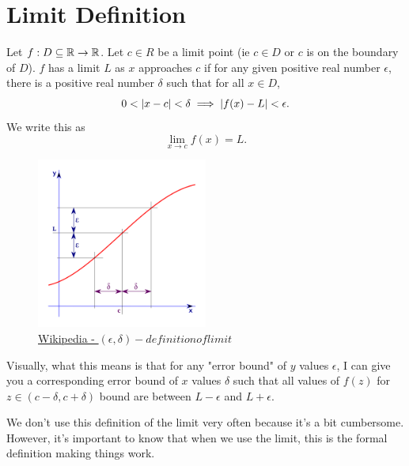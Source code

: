 \section{Limit Definition}
\begin{definition}
	Let $f : D \subseteq \mathbb{R} \to \mathbb{R}$.
	Let $c \in R$ be a limit point (ie $c \in D$ or $c$ is on the boundary of $D$).
	$f$ has a limit $L$ as $x$ approaches $c$ if for any given positive real number $\epsilon$, there is a positive real number $\delta$ such that for all $x \in D$,
	\begin{equation*}
		0 < \lvert x-c \rvert < \delta \implies \lvert f(x) - L \rvert < \epsilon.
	\end{equation*}
	We write this as
	\begin{equation*}
		\lim_{x \to c}{f(x)} = L.	
	\end{equation*}
\end{definition}

\begin{figure}[H]
	\label{unitCircle}
	\centering
	\includegraphics[width = 0.5\textwidth]{./limits_continuity/limit_epsilon_delta.png}
	\caption{\hyperref{https://en.wikipedia.org/wiki/(\%CE\%B5,\_\%CE\%B4)-definition\_of\_limit}{}{}{Wikipedia - $(\epsilon, \delta)-definition of limit$}}
\end{figure}
\noindent
Visually, what this means is that for any "error bound" of $y$ values $\epsilon$, I can give you a corresponding error bound of $x$ values $\delta$ such that all values of $f(z)$ for $z \in (c -\delta, c+ \delta)$ bound are between $L - \epsilon$ and $L + \epsilon$.

\noindent
We don't use this definition of the limit very often because it's a bit cumbersome.
However, it's important to know that when we use the limit, this is the formal definition making things work.

